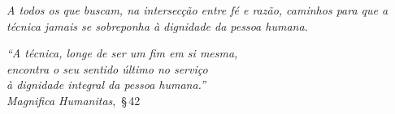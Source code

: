 \documentclass[
    12pt,
    openany,
    oneside,
    a4paper,
    brazilian
]{abntex2}
\newcommand{\MH}{\textit{Magnifica Humanitas}}
\begin{document}
\imprimircapa

\imprimirfolhaderosto



\begin{dedicatoria}
    \vspace*{\fill}
    \noindent
    \textit{A todos os que buscam, na intersecção entre fé e razão, caminhos para que a técnica jamais se sobreponha à dignidade da pessoa humana.}
    \vspace*{\fill}
\end{dedicatoria}

\begin{agradecimentos}
\end{agradecimentos}

\begin{epigrafe}
    \vspace*{\fill}
    \begin{flushright}
        \textit{``A técnica, longe de ser um fim em si mesma,}\\
        \textit{encontra o seu sentido último no serviço}\\
        \textit{à dignidade integral da pessoa humana.''}\\
        \vspace{0.3cm}
        \MH,~§\,42
    \end{flushright}
    \vspace*{\fill}
\end{epigrafe}
\end{document}
